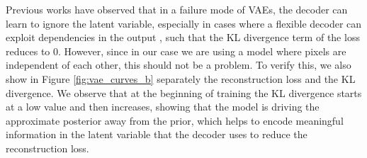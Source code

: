 \documentclass{article}
\begin{document}
Previous works have observed that in a failure mode of VAEs, the decoder can learn to ignore the latent variable, especially in cases where a flexible decoder can exploit dependencies in the output \cite{bowman2016gensentcontinuous}, such that the KL divergence term of the loss reduces to 0. However, since in our case we are using a model where pixels are independent of each other, this should not be a problem. To verify this, we also show in Figure \ref{fig:vae_curves_b} separately the reconstruction loss and the KL divergence. We observe that at the beginning of training the KL divergence starts at a low value and then increases, showing that the model is driving the approximate posterior away from the prior, which helps to encode meaningful information in the latent variable that the decoder uses to reduce the reconstruction loss.
\end{document}
